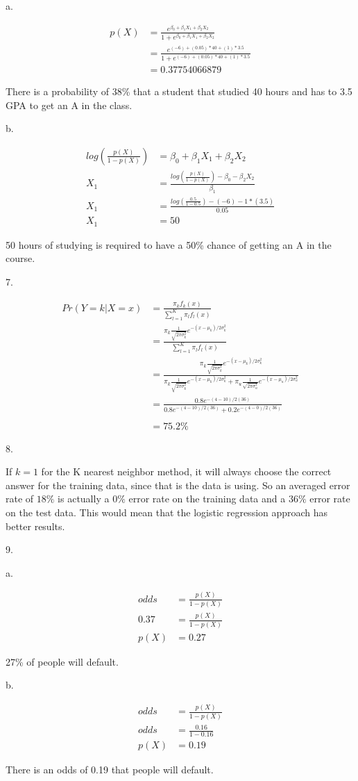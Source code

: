 \documentclass[
]{article}
\begin{document}
a.

\begin{align}
p(X) &= \frac{e^{\beta_0 + \beta_1X_1 + \beta_2X_2}}{1+e^{\beta_0 + \beta_1X_1 + \beta_2X_2}} \\
&= \frac{e^{(-6)+(0.05)*40+(1)*3.5}}{1 + e^{(-6)+(0.05)*40+(1)*3.5}} \\
&= 0.37754066879
\end{align}

There is a probability of 38\% that a student that studied 40 hours and
has to 3.5 GPA to get an A in the class.

b.

\begin{align}
log(\frac{p(X)}{1-p(X)}) &= \beta_0 + \beta_1X_1 + \beta_2X_2 \\
 X_1 &= \frac{log(\frac{p(X)}{1-p(X)}) - \beta_0 - \beta_2X_2}{\beta_1} \\
 X_1 &= \frac{log(\frac{0.5}{1-0.5}) - (-6) - 1*(3.5)}{0.05} \\
 X_1 &= 50
\end{align}

50 hours of studying is required to have a 50\% chance of getting an A
in the course.

7.

\begin{align}
Pr(Y=k|X=x) &= \frac{\pi_kf_k(x)}{\sum^K_{l=1}\pi_lf_l(x)} \\
&= \frac{\pi_k \frac{1}{\sqrt{2\pi\sigma_k^2}}e^{-(x-\mu_k)/2\sigma_k^2} }{\sum^K_{l=1}\pi_lf_l(x)} \\
&= \frac{\pi_k \frac{1}{\sqrt{2\pi\sigma_k^2}}e^{-(x-\mu_k)/2\sigma_k^2} }{\pi_k \frac{1}{\sqrt{2\pi\sigma_k^2}}e^{-(x-\mu_k)/2\sigma_k^2} + \pi_u \frac{1}{\sqrt{2\pi\sigma_u^2}}e^{-(x-\mu_u)/2\sigma_u^2} } \\
&= \frac{0.8 e^{-(4-10)/2(36)} }{0.8 e^{-(4-10)/2(36)} + 0.2 e^{-(4-0)/2(36)} }\\\\
&= 75.2\%
\end{align}

8.

If \(k=1\) for the K nearest neighbor method, it will always choose the
correct answer for the training data, since that is the data is using.
So an averaged error rate of \(18\%\) is actually a \(0\%\) error rate
on the training data and a \(36\%\) error rate on the test data. This
would mean that the logistic regression approach has better results.

9.

a.

\begin{align}
odds &= \frac{p(X)}{1-p(X)}\\
0.37&= \frac{p(X)}{1-p(X)}\\
p(X) &= 0.27
\end{align}

27\% of people will default.

b.

\begin{align}
odds &= \frac{p(X)}{1-p(X)}\\
odds&= \frac{0.16}{1-0.16}\\
p(X) &= 0.19
\end{align}

There is an odds of 0.19 that people will default.
\end{document}
